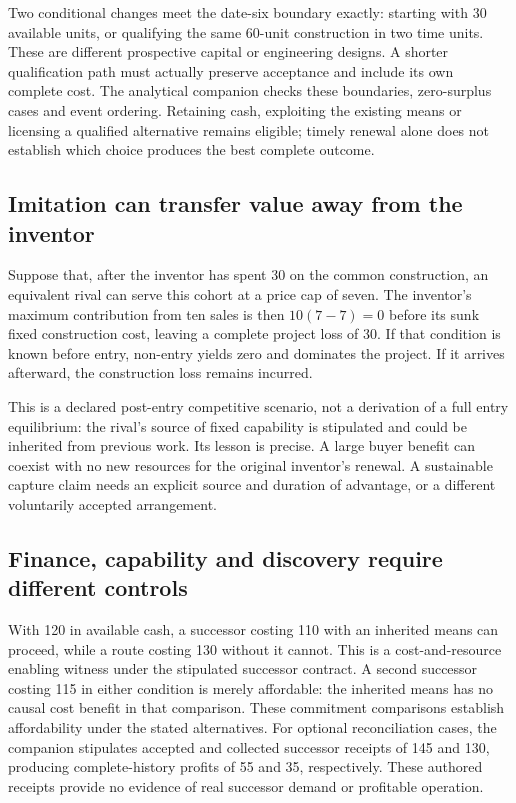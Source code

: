 \documentclass[11pt,letterpaper]{article}
\begin{document}
Two conditional changes meet the date-six boundary exactly: starting with 30 available units, or qualifying the same 60-unit construction in two time units. These are different prospective capital or engineering designs. A shorter qualification path must actually preserve acceptance and include its own complete cost. The analytical companion checks these boundaries, zero-surplus cases and event ordering. Retaining cash, exploiting the existing means or licensing a qualified alternative remains eligible; timely renewal alone does not establish which choice produces the best complete outcome.

\subsection{Imitation can transfer value away from the inventor}
Suppose that, after the inventor has spent 30 on the common construction, an equivalent rival can serve this cohort at a price cap of seven. The inventor's maximum contribution from ten sales is then $10(7-7)=0$ before its sunk fixed construction cost, leaving a complete project loss of 30. If that condition is known before entry, non-entry yields zero and dominates the project. If it arrives afterward, the construction loss remains incurred.

This is a declared post-entry competitive scenario, not a derivation of a full entry equilibrium: the rival's source of fixed capability is stipulated and could be inherited from previous work. Its lesson is precise. A large buyer benefit can coexist with no new resources for the original inventor's renewal. A sustainable capture claim needs an explicit source and duration of advantage, or a different voluntarily accepted arrangement.

\subsection{Finance, capability and discovery require different controls}
With 120 in available cash, a successor costing 110 with an inherited means can proceed, while a route costing 130 without it cannot. This is a cost-and-resource enabling witness under the stipulated successor contract. A second successor costing 115 in either condition is merely affordable: the inherited means has no causal cost benefit in that comparison. These commitment comparisons establish affordability under the stated alternatives. For optional reconciliation cases, the companion stipulates accepted and collected successor receipts of 145 and 130, producing complete-history profits of 55 and 35, respectively. These authored receipts provide no evidence of real successor demand or profitable operation.
\end{document}

